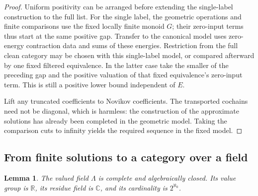 \documentclass[11pt]{article}
\numberwithin{equation}{section}
\newtheorem{lemma}[theorem]{Lemma}
\theoremstyle{definition}
\theoremstyle{remark}
\begin{document}
\begin{proof}
Uniform positivity can be arranged before extending the single-label
construction to the full list.  For the single label, the geometric
operations and finite comparisons use the fixed locally finite monoid
$G$; their zero-input terms thus start at the same positive gap.
Transfer to the canonical model uses zero-energy contraction data and sums of these energies.  Restriction from the full clean
category may be chosen with this single-label model, or compared
afterward by one fixed filtered equivalence.  In the latter case
take the smaller of the preceding gap and the positive valuation
of that fixed equivalence's zero-input term.  This is still a
positive lower bound independent of $E$.

Lift any truncated coefficients to Novikov coefficients.  The
transported cochains need not be diagonal, which is harmless:
the construction of the approximate solutions has already been
completed in the geometric model.  Taking the comparison cuts to
infinity yields the required sequence in the fixed model.
\end{proof}

\subsection{From finite solutions to a category over a field}
\label{subsec:floer-field}

\begin{lemma}\label{lem:field-novikov}
The valued field $\Lambda$ is complete and algebraically closed.  Its
value group is $\mathbb R$, its residue field is $\mathbb C$, and its cardinality is
$2^{\aleph_0}$.
\end{lemma}
\end{document}
